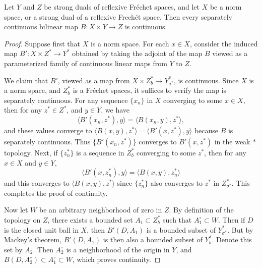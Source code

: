 \begin{theorem}
    Let $Y$ and $Z$ be strong duals of reflexive Fr\'{e}chet spaces, and let $X$ be a norm space, or a strong dual of a reflexive Frech\'{e}t space. Then every separately continuous bilinear map $B: X \times Y \to Z$ is continuous.
\end{theorem}
\begin{proof}
    Suppose first that $X$ is a norm space. For each $x \in X$, consider the induced map $B': X \times Z^* \to Y^*$ obtained by taking the adjoint of the map $B$ viewed as a parameterized family of continuous linear maps from $Y$ to $Z$.

    We claim that $B'$, viewed as a map from $X \times Z^*_b \to Y^*_{\sigma^*}$, is continuous. Since $X$ is a norm space, and $Z^*_b$ is a Fr\'{e}chet spaces, it suffices to verify the map is separately continuous. For any sequence $\{ x_n \}$ in $X$ converging to some $x \in X$, then for any $z^* \in Z^*$, and $y \in Y$, we have
    \[ \langle B'(x_n,z^*), y \rangle = \langle B(x_n,y), z^* \rangle, \]
    and these values converge to $\langle B(x,y), z^* \rangle = \langle B'(x,z^*), y \rangle$ because $B$ is separately continuous. Thus $\{ B'(x_n, z^*) \}$ converges to $B'(x,z^*)$ in the weak $*$ topology. Next, if $\{ z_n^* \}$ is a sequence in $Z^*_b$ converging to some $z^*$, then for any $x \in X$ and $y \in Y$,
    \[ \langle B'(x,z_n^*), y \rangle = \langle B(x,y), z_n^* \rangle \]
    and this converges to $\langle B(x,y), z^* \rangle$ since $\{ z_n^* \}$ also converges to $z^*$ in $Z^*_{\sigma^*}$. This completes the proof of continuity.

    Now let $W$ be an arbitrary neighborhood of zero in $Z$. By definition of the topology on $Z$, there exists a bounded set $A_1 \subset Z^*_b$ such that $A_1^\circ \subset W$. Then if $D$ is the closed unit ball in $X$, then $B'(D,A_1)$ is a bounded subset of $Y^*_{\sigma^*}$. But by Mackey's theorem, $B'(D,A_1)$ is then also a bounded subset of $Y^*_b$. Denote this set by $A_2$. Then $A_2^\circ$ is a neighborhood of the origin in $Y$, and $B(D,A_2^\circ) \subset A_1^\circ \subset W$, which proves continuity.


\end{proof}
